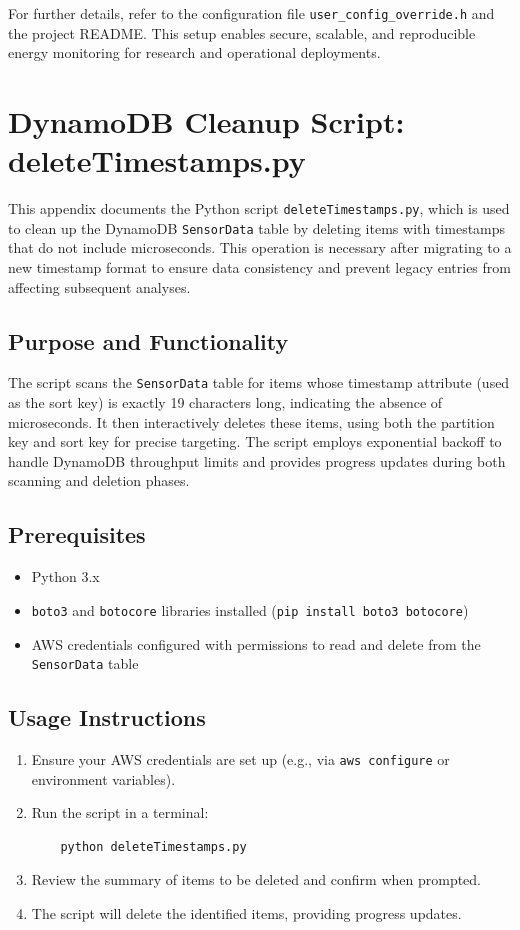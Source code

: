 For further details, refer to the configuration file \texttt{user\_config\_override.h} and the project README. This setup enables secure, scalable, and reproducible energy monitoring for research and operational deployments.

\newpage
\section{DynamoDB Cleanup Script: deleteTimestamps.py}
\label{appendix:delete-timestamps}

This appendix documents the Python script \texttt{deleteTimestamps.py}, which is used to clean up the DynamoDB \texttt{SensorData} table by deleting items with timestamps that do not include microseconds. This operation is necessary after migrating to a new timestamp format to ensure data consistency and prevent legacy entries from affecting subsequent analyses.

\subsection{Purpose and Functionality}
The script scans the \texttt{SensorData} table for items whose timestamp attribute (used as the sort key) is exactly 19 characters long, indicating the absence of microseconds. It then interactively deletes these items, using both the partition key and sort key for precise targeting. The script employs exponential backoff to handle DynamoDB throughput limits and provides progress updates during both scanning and deletion phases.

\subsection{Prerequisites}
\begin{itemize}
    \item Python 3.x
    \item \texttt{boto3} and \texttt{botocore} libraries installed (\texttt{pip install boto3 botocore})
    \item AWS credentials configured with permissions to read and delete from the \texttt{SensorData} table
\end{itemize}

\subsection{Usage Instructions}
\begin{enumerate}
    \item Ensure your AWS credentials are set up (e.g., via \texttt{aws configure} or environment variables).
    \item Run the script in a terminal:
    \begin{lstlisting}
    python deleteTimestamps.py
    \end{lstlisting}
    \item Review the summary of items to be deleted and confirm when prompted.
    \item The script will delete the identified items, providing progress updates.
\end{enumerate}

